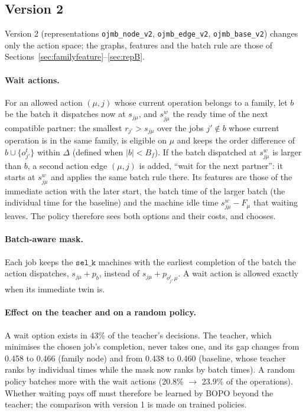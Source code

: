 \documentclass[11pt,a4paper]{article}
\begin{document}
\subsection{Version 2}
Version 2 (representations \texttt{ojmb\_node\_v2}, \texttt{ojmb\_edge\_v2},
\texttt{ojmb\_base\_v2}) changes only the action space; the graphs, features and the batch
rule are those of Sections~\ref{sec:familyfeature}--\ref{sec:repB}.

\paragraph{Wait actions.} For an allowed action $(\mu,j)$ whose current operation belongs
to a family, let $b$ be the batch it dispatches now at $s_{j\mu}$, and $s^{w}_{j\mu}$ the
ready time of the next compatible partner: the smallest $r_{j'}>s_{j\mu}$ over the jobs
$j'\notin b$ whose current operation is in the same family, is eligible on $\mu$ and keeps
the order difference of $b\cup\{o_{j'}^t\}$ within $\Delta$ (defined when $|b|<B_f$).
If the batch dispatched at $s^{w}_{j\mu}$ is larger than $b$, a second action edge
$(\mu,j)$ is added, ``wait for the next partner'': it starts at $s^{w}_{j\mu}$ and applies
the same batch rule there. Its features are those of the immediate action with the later
start, the batch time of the larger batch (the individual time for the baseline) and the
machine idle time $s^{w}_{j\mu}-F_\mu$ that waiting leaves. The policy therefore sees both
options and their costs, and chooses.

\paragraph{Batch-aware mask.} Each job keeps the $\texttt{sel\_k}$ machines with the
earliest completion of the batch the action dispatches, $s_{j\mu}+p_b$, instead of
$s_{j\mu}+p_{o_j^t,\mu}$. A wait action is allowed exactly when its immediate twin is.

\paragraph{Effect on the teacher and on a random policy.} A wait option exists in 43\% of
the teacher's decisions. The teacher, which minimises the chosen job's completion, never
takes one, and its gap changes from 0.458 to 0.466 (family node) and from 0.438 to 0.460
(baseline, whose teacher ranks by individual times while the mask now ranks by batch
times). A random policy batches more with the wait actions (20.8\% $\to$ 23.9\% of the
operations). Whether waiting pays off must therefore be learned by BOPO beyond the
teacher; the comparison with version 1 is made on trained policies.
\end{document}

